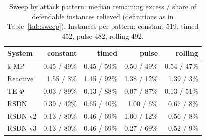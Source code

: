 \begin{table}[t]\centering\scriptsize
\caption{Sweep by attack pattern: median remaining excess / share of defendable instances relieved (definitions as in Table~\ref{tab:sweep}). Instances per pattern: constant 519, timed 452, pulse 482, rolling 492.}
\label{tab:sweep_pattern}
\setlength{\tabcolsep}{3pt}
\begin{tabular}{lrrrr}
\toprule
System & constant & timed & pulse & rolling\\
\midrule
k-MP & 0.45 / 49\% & 0.45 / 59\% & 0.50 / 49\% & 0.54 / 47\%\\
Reactive & 1.55 / 8\% & 1.45 / 92\% & 1.38 / 12\% & 1.39 / 3\%\\
TE-$\Phi$ & 0.03 / 89\% & 0.13 / 88\% & 0.07 / 87\% & 0.13 / 51\%\\
RSDN & 0.39 / 42\% & 0.65 / 40\% & 1.00 / 6\% & 0.67 / 8\%\\
RSDN-v2 & 0.13 / 80\% & 0.46 / 69\% & 1.00 / 12\% & 0.56 / 8\%\\
RSDN-v3 & 0.13 / 80\% & 0.46 / 69\% & 0.27 / 69\% & 0.52 / 9\%\\
\bottomrule
\end{tabular}
\end{table}